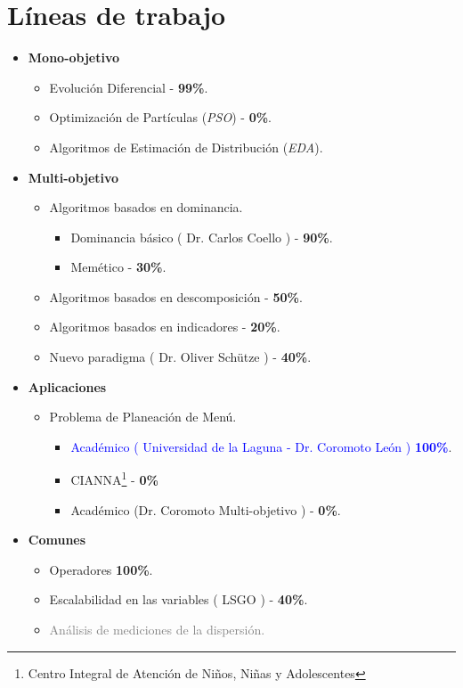 \pagebreak
\section{Líneas de trabajo}
    \begin{itemize}
        \item \textbf{Mono-objetivo}
           \begin{itemize}
                \item { \color{blue} Evolución Diferencial - \textbf{99\%}}.
               \item Optimización de Partículas (\textit{PSO})  - \textbf{0\%}.
               \item { \color{gray}Algoritmos de Estimación de Distribución (\textit{EDA})}.
           \end{itemize}
        \item \textbf{Multi-objetivo}
        \begin{itemize}
            \item Algoritmos basados en dominancia.
            \begin{itemize}
                \item Dominancia básico ( Dr. Carlos Coello ) - \textbf{90\%}.
                \item Memético - \textbf{30\%}.
            \end{itemize}
            \item Algoritmos basados en descomposición - \textbf{50\%}.
            \item Algoritmos basados en indicadores - \textbf{20\%}.
            \item Nuevo paradigma ( Dr. Oliver Schütze ) - \textbf{40\%}.
        \end{itemize}
         \item \textbf{Aplicaciones}
         \begin{itemize}
             \item Problema de Planeación de Menú.
              \begin{itemize}
                  \item \textcolor{blue}{Académico ( Universidad de la Laguna - Dr. Coromoto León ) \textbf{100\%}}.
                  \item CIANNA\footnote{Centro Integral de Atención de Niños, Niñas y Adolescentes} - \textbf{0\%} 
                  \item Académico (Dr. Coromoto Multi-objetivo ) - \textbf{0\%}.
              \end{itemize} 
         \end{itemize}
          \item \textbf{Comunes}
          \begin{itemize}
              \item { \color{blue} Operadores \textbf{100\%}.}
              \item Escalabilidad en las variables ( LSGO ) - \textbf{40\%}.
              \item \textcolor{gray}{Análisis de mediciones de la dispersión.}
          \end{itemize}
    \end{itemize}